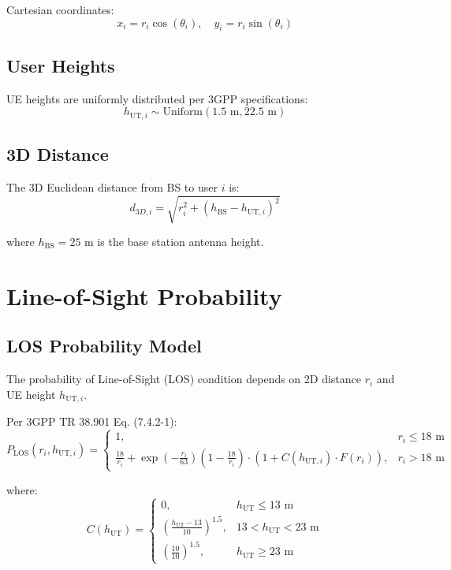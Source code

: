 Cartesian coordinates:
\begin{equation}
x_i = r_i \cos(\theta_i), \quad y_i = r_i \sin(\theta_i)
\end{equation}

\subsection{User Heights}

UE heights are uniformly distributed per 3GPP specifications:
\begin{equation}
h_{\text{UT},i} \sim \text{Uniform}(1.5 \text{ m}, 22.5 \text{ m})
\end{equation}

\subsection{3D Distance}

The 3D Euclidean distance from BS to user $i$ is:
\begin{equation}
d_{3D,i} = \sqrt{r_i^2 + (h_{\text{BS}} - h_{\text{UT},i})^2}
\end{equation}

where $h_{\text{BS}} = 25$ m is the base station antenna height.

\section{Line-of-Sight Probability}

\subsection{LOS Probability Model}

The probability of Line-of-Sight (LOS) condition depends on 2D distance $r_i$ and UE height $h_{\text{UT},i}$.

Per 3GPP TR 38.901 Eq. (7.4.2-1):
\begin{equation}
P_{\text{LOS}}(r_i, h_{\text{UT},i}) = \begin{cases}
1, & r_i \leq 18 \text{ m} \\
\frac{18}{r_i} + \exp\left(-\frac{r_i}{63}\right) \left(1 - \frac{18}{r_i}\right) \cdot \left(1 + C(h_{\text{UT},i}) \cdot F(r_i)\right), & r_i > 18 \text{ m}
\end{cases}
\end{equation}

where:
\begin{equation}
C(h_{\text{UT}}) = \begin{cases}
0, & h_{\text{UT}} \leq 13 \text{ m} \\
\left(\frac{h_{\text{UT}} - 13}{10}\right)^{1.5}, & 13 < h_{\text{UT}} < 23 \text{ m} \\
\left(\frac{10}{10}\right)^{1.5}, & h_{\text{UT}} \geq 23 \text{ m}
\end{cases}
\end{equation}

